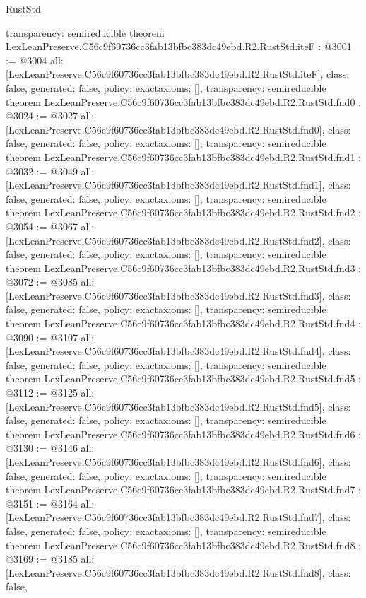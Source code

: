 \begin{lexlean}{RustStd}
\begin{coremodule}
{  transparency: semireducible
}
theorem LexLeanPreserve.C56c9f60736cc3fab13bfbc383dc49ebd.R2.RustStd.iteF : @3001 := @3004 {
  all: [LexLeanPreserve.C56c9f60736cc3fab13bfbc383dc49ebd.R2.RustStd.iteF],
  class: false,
  generated: false,
  policy: exact{axioms: []},
  transparency: semireducible
}
theorem LexLeanPreserve.C56c9f60736cc3fab13bfbc383dc49ebd.R2.RustStd.fnd0 : @3024 := @3027 {
  all: [LexLeanPreserve.C56c9f60736cc3fab13bfbc383dc49ebd.R2.RustStd.fnd0],
  class: false,
  generated: false,
  policy: exact{axioms: []},
  transparency: semireducible
}
theorem LexLeanPreserve.C56c9f60736cc3fab13bfbc383dc49ebd.R2.RustStd.fnd1 : @3032 := @3049 {
  all: [LexLeanPreserve.C56c9f60736cc3fab13bfbc383dc49ebd.R2.RustStd.fnd1],
  class: false,
  generated: false,
  policy: exact{axioms: []},
  transparency: semireducible
}
theorem LexLeanPreserve.C56c9f60736cc3fab13bfbc383dc49ebd.R2.RustStd.fnd2 : @3054 := @3067 {
  all: [LexLeanPreserve.C56c9f60736cc3fab13bfbc383dc49ebd.R2.RustStd.fnd2],
  class: false,
  generated: false,
  policy: exact{axioms: []},
  transparency: semireducible
}
theorem LexLeanPreserve.C56c9f60736cc3fab13bfbc383dc49ebd.R2.RustStd.fnd3 : @3072 := @3085 {
  all: [LexLeanPreserve.C56c9f60736cc3fab13bfbc383dc49ebd.R2.RustStd.fnd3],
  class: false,
  generated: false,
  policy: exact{axioms: []},
  transparency: semireducible
}
theorem LexLeanPreserve.C56c9f60736cc3fab13bfbc383dc49ebd.R2.RustStd.fnd4 : @3090 := @3107 {
  all: [LexLeanPreserve.C56c9f60736cc3fab13bfbc383dc49ebd.R2.RustStd.fnd4],
  class: false,
  generated: false,
  policy: exact{axioms: []},
  transparency: semireducible
}
theorem LexLeanPreserve.C56c9f60736cc3fab13bfbc383dc49ebd.R2.RustStd.fnd5 : @3112 := @3125 {
  all: [LexLeanPreserve.C56c9f60736cc3fab13bfbc383dc49ebd.R2.RustStd.fnd5],
  class: false,
  generated: false,
  policy: exact{axioms: []},
  transparency: semireducible
}
theorem LexLeanPreserve.C56c9f60736cc3fab13bfbc383dc49ebd.R2.RustStd.fnd6 : @3130 := @3146 {
  all: [LexLeanPreserve.C56c9f60736cc3fab13bfbc383dc49ebd.R2.RustStd.fnd6],
  class: false,
  generated: false,
  policy: exact{axioms: []},
  transparency: semireducible
}
theorem LexLeanPreserve.C56c9f60736cc3fab13bfbc383dc49ebd.R2.RustStd.fnd7 : @3151 := @3164 {
  all: [LexLeanPreserve.C56c9f60736cc3fab13bfbc383dc49ebd.R2.RustStd.fnd7],
  class: false,
  generated: false,
  policy: exact{axioms: []},
  transparency: semireducible
}
theorem LexLeanPreserve.C56c9f60736cc3fab13bfbc383dc49ebd.R2.RustStd.fnd8 : @3169 := @3185 {
  all: [LexLeanPreserve.C56c9f60736cc3fab13bfbc383dc49ebd.R2.RustStd.fnd8],
  class: false,
}
\end{coremodule}
\end{lexlean}
